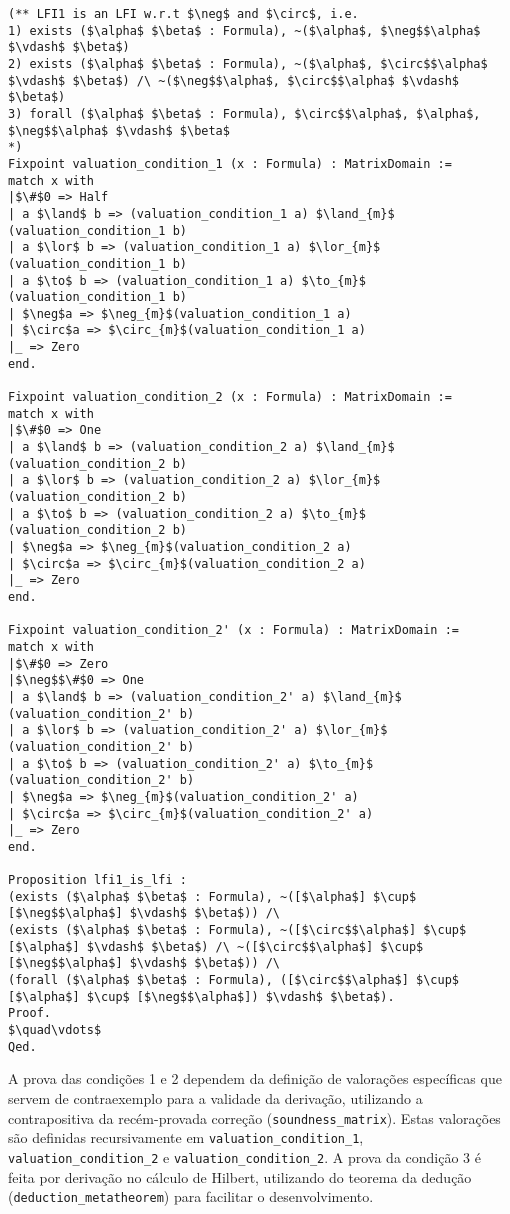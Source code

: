         \begin{lstlisting}[name=LFI, frame=single, language=coq]
(** LFI1 is an LFI w.r.t $\neg$ and $\circ$, i.e. 
1) exists ($\alpha$ $\beta$ : Formula), ~($\alpha$, $\neg$$\alpha$ $\vdash$ $\beta$)
2) exists ($\alpha$ $\beta$ : Formula), ~($\alpha$, $\circ$$\alpha$ $\vdash$ $\beta$) /\ ~($\neg$$\alpha$, $\circ$$\alpha$ $\vdash$ $\beta$)
3) forall ($\alpha$ $\beta$ : Formula), $\circ$$\alpha$, $\alpha$, $\neg$$\alpha$ $\vdash$ $\beta$
*)
Fixpoint valuation_condition_1 (x : Formula) : MatrixDomain :=
match x with 
|$\#$0 => Half
| a $\land$ b => (valuation_condition_1 a) $\land_{m}$ (valuation_condition_1 b)
| a $\lor$ b => (valuation_condition_1 a) $\lor_{m}$ (valuation_condition_1 b)
| a $\to$ b => (valuation_condition_1 a) $\to_{m}$ (valuation_condition_1 b)
| $\neg$a => $\neg_{m}$(valuation_condition_1 a)
| $\circ$a => $\circ_{m}$(valuation_condition_1 a)
|_ => Zero 
end.

Fixpoint valuation_condition_2 (x : Formula) : MatrixDomain :=
match x with 
|$\#$0 => One
| a $\land$ b => (valuation_condition_2 a) $\land_{m}$ (valuation_condition_2 b)
| a $\lor$ b => (valuation_condition_2 a) $\lor_{m}$ (valuation_condition_2 b)
| a $\to$ b => (valuation_condition_2 a) $\to_{m}$ (valuation_condition_2 b)
| $\neg$a => $\neg_{m}$(valuation_condition_2 a)
| $\circ$a => $\circ_{m}$(valuation_condition_2 a)
|_ => Zero 
end.

Fixpoint valuation_condition_2' (x : Formula) : MatrixDomain :=
match x with 
|$\#$0 => Zero
|$\neg$$\#$0 => One
| a $\land$ b => (valuation_condition_2' a) $\land_{m}$ (valuation_condition_2' b)
| a $\lor$ b => (valuation_condition_2' a) $\lor_{m}$ (valuation_condition_2' b)
| a $\to$ b => (valuation_condition_2' a) $\to_{m}$ (valuation_condition_2' b)
| $\neg$a => $\neg_{m}$(valuation_condition_2' a)
| $\circ$a => $\circ_{m}$(valuation_condition_2' a)
|_ => Zero 
end.

Proposition lfi1_is_lfi :
(exists ($\alpha$ $\beta$ : Formula), ~([$\alpha$] $\cup$ [$\neg$$\alpha$] $\vdash$ $\beta$)) /\
(exists ($\alpha$ $\beta$ : Formula), ~([$\circ$$\alpha$] $\cup$ [$\alpha$] $\vdash$ $\beta$) /\ ~([$\circ$$\alpha$] $\cup$ [$\neg$$\alpha$] $\vdash$ $\beta$)) /\
(forall ($\alpha$ $\beta$ : Formula), ([$\circ$$\alpha$] $\cup$ [$\alpha$] $\cup$ [$\neg$$\alpha$]) $\vdash$ $\beta$).
Proof.
$\quad\vdots$
Qed.
        \end{lstlisting}

        A prova das condições 1 e 2 dependem da definição de valorações específicas que servem de contraexemplo para a validade da derivação, utilizando a contrapositiva da recém-provada correção (\texttt{soundness\_matrix}). Estas valorações são definidas recursivamente em \texttt{valuation\_condition\_1}, \texttt{valuation\_condition\_2} e \texttt{valuation\_condition\_2\textquotesingle}. A prova da condição 3 é feita por derivação no cálculo de Hilbert, utilizando do teorema da dedução (\texttt{deduction\_metatheorem}) para facilitar o desenvolvimento.
    
